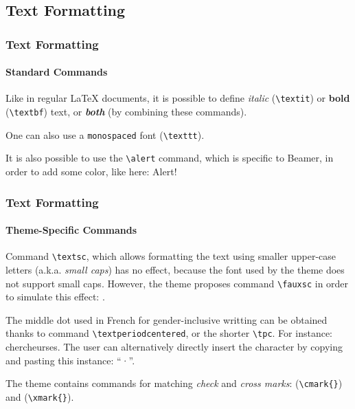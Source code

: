 \documentclass[10pt,    %
    english,            %
    xcolor=table,       %
    envcountsect,        %
    aspectratio=169     %
]{beamer}
\begin{document}
\subsection{Text Formatting}
\begin{frame}
    \frametitle{Text Formatting} 
    \framesubtitle{Standard Commands} 
    
    Like in regular \LaTeX{} documents, it is possible to define \textit{italic} (\texttt{\textbackslash{}textit}) or \textbf{bold} (\texttt{\textbackslash{}textbf}) text, or \textit{\textbf{both}} (by combining these commands). 
    
    \vspace{0.25cm}
    One can also use a \texttt{monospaced} font (\texttt{\textbackslash{}texttt}).
    
    \vspace{0.25cm}
    It is also possible to use the \texttt{\textbackslash{}alert} command, which is specific to Beamer, in order to add some color, like here: \alert{Alert!}
\end{frame}
    
\begin{frame}
    \frametitle{Text Formatting} 
    \framesubtitle{Theme-Specific Commands} 
    
    Command \texttt{\textbackslash{}textsc}, which allows formatting the text using smaller upper-case letters (a.k.a. \textit{small caps}) has no effect, because the font used by the theme does not support small caps. However, the theme proposes command \texttt{\textbackslash{}fauxsc} in order to simulate this effect: .
    
    \vspace{0.25cm}
    The middle dot used in French for gender-inclusive writting can be obtained thanks to command \texttt{\textbackslash{}textperiodcentered}, or the shorter \texttt{\textbackslash{}tpc}. For instance: chercheur\textperiodcentered{}se\tpc{}s. The user can alternatively directly insert the character by copying and pasting this instance: ``·''.

    \vspace{0.25cm}
    The theme contains commands for matching \textit{check} and \textit{cross marks}: \cmark{} (\texttt{\textbackslash{}cmark\{\}}) and \xmark{} (\texttt{\textbackslash{}xmark\{\}}).
\end{frame}
    
\end{document}
